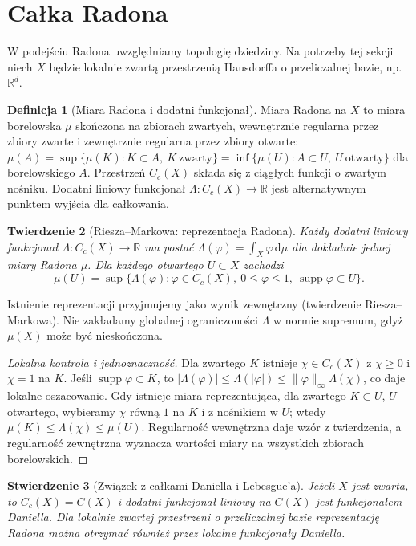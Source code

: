 \documentclass[11pt,a4paper]{article}
\numberwithin{equation}{section}
\theoremstyle{plain}
\newtheorem{twierdzenie}{Twierdzenie}[section]
\newtheorem{stwierdzenie}[twierdzenie]{Stwierdzenie}
\theoremstyle{definition}
\newtheorem{definicja}[twierdzenie]{Definicja}
\theoremstyle{remark}
\newcommand{\R}{\mathbb R}
\newcommand{\supp}{\operatorname{supp}}
\begin{document}
\section{Całka Radona}
W podejściu Radona uwzględniamy topologię dziedziny. Na potrzeby tej sekcji niech $X$ będzie lokalnie zwartą przestrzenią Hausdorffa o przeliczalnej bazie, np. $\R^d$.
\begin{definicja}[Miara Radona i dodatni funkcjonał]
Miara Radona na $X$ to miara borelowska $\mu$ skończona na zbiorach zwartych, wewnętrznie regularna przez zbiory zwarte i zewnętrznie regularna przez zbiory otwarte:
$\mu(A)=\sup\{\mu(K):K\subset A,\ K\ \text{zwarty}\}=\inf\{\mu(U):A\subset U,\ U\ \text{otwarty}\}$ dla borelowskiego $A$. Przestrzeń $C_c(X)$ składa się z ciągłych funkcji o zwartym nośniku. Dodatni liniowy funkcjonał $\Lambda:C_c(X)\to\R$ jest alternatywnym punktem wyjścia dla całkowania.
\end{definicja}
\begin{twierdzenie}[Riesza--Markowa: reprezentacja Radona]
Każdy dodatni liniowy funkcjonał $\Lambda:C_c(X)\to\R$ ma postać $\Lambda(\varphi)=\int_X\varphi\,\mathrm d\mu$ dla dokładnie jednej miary Radona $\mu$. Dla każdego otwartego $U\subset X$ zachodzi
\[
\mu(U)=\sup\{\Lambda(\varphi):\varphi\in C_c(X),\ 0\le\varphi\le1,\ \supp\varphi\subset U\}.
\]
\end{twierdzenie}
Istnienie reprezentacji przyjmujemy jako wynik zewnętrzny (twierdzenie Riesza--Markowa). Nie zakładamy globalnej ograniczoności $\Lambda$ w normie supremum, gdyż $\mu(X)$ może być nieskończona.
\begin{proof}[Lokalna kontrola i jednoznaczność]
Dla zwartego $K$ istnieje $\chi\in C_c(X)$ z $\chi\ge0$ i $\chi=1$ na $K$. Jeśli $\supp\varphi\subset K$, to $|\Lambda(\varphi)|\le\Lambda(|\varphi|)\le\|\varphi\|_\infty\Lambda(\chi)$, co daje lokalne oszacowanie. Gdy istnieje miara reprezentująca, dla zwartego $K\subset U$, $U$ otwartego, wybieramy $\chi$ równą $1$ na $K$ i z nośnikiem w $U$; wtedy $\mu(K)\le\Lambda(\chi)\le\mu(U)$. Regularność wewnętrzna daje wzór z twierdzenia, a regularność zewnętrzna wyznacza wartości miary na wszystkich zbiorach borelowskich.
\end{proof}
\begin{stwierdzenie}[Związek z całkami Daniella i Lebesgue'a]
Jeżeli $X$ jest zwarta, to $C_c(X)=C(X)$ i dodatni funkcjonał liniowy na $C(X)$ jest funkcjonałem Daniella. Dla lokalnie zwartej przestrzeni o przeliczalnej bazie reprezentację Radona można otrzymać również przez lokalne funkcjonały Daniella.
\end{stwierdzenie}
\end{document}
